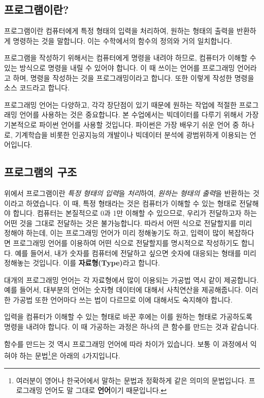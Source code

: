 \documentclass[twoside]{article}
\begin{document}
\subsection{프로그램이란?} 

프로그램이란 컴퓨터에게 특정 형태의 입력을 처리하여, 원하는 형태의 출력을 반환하게 명령하는 것을 말합니다. 이는 수학에서의 함수의 정의와 거의 일치합니다. 

프로그램을 작성하기 위해서는 컴퓨터에게 명령을 내려야 하므로, 컴퓨터가 이해할 수 있는 방식으로 명령을 내릴 수 있어야 합니다. 이 때 쓰이는 언어를 프로그래밍 언어라고 하며, 명령을 작성하는 것을 프로그래밍이라고 합니다. 또한 이렇게 작성한 명령을 소스 코드라고 합니다. 

프로그래밍 언어는 다양하고, 각각 장단점이 있기 때문에 원하는 작업에 적절한 프로그래밍 언어를 사용하는 것은 중요합니다. 본 수업에서는 빅데이터를 다루기 위해서 가장 기본적으로 파이썬 언어를 사용할 것입니다. 파이썬은 가장 배우기 쉬운 언어 중 하나로, 기계학습을 비롯한 인공지능의 개발이나 빅데이터 분석에 광범위하게 이용되는 언어입니다. 

\subsection{프로그램의 구조} 

위에서 프로그램이란 \textit{특정 형태의 입력}을 \textit{처리}하여, \textit{원하는 형태의 출력}을 반환하는 것이라고 하였습니다. 이 때, 특정 형태라는 것은 컴퓨터가 이해할 수 있는 형태로 전달해야 합니다. 컴퓨터는 본질적으로 0과 1만 이해할 수 있으므로, 우리가 전달하고자 하는 어떤 것을 그대로 전달하는 것은 불가능합니다. 따라서 어떤 식으로 전달할지를 미리 정해야 하는데, 이는 프로그래밍 언어가 미리 정해놓기도 하고, 입력이 많이 복잡하다면 프로그래밍 언어를 이용하여 어떤 식으로 전달할지를 명시적으로 작성하기도 합니다. 예를 들어서, 내가 숫자를 컴퓨터에 전달하고 싶으면 숫자에 대응되는 형태를 미리 정해놓는 것입니다. 이를 \textbf{자료형(Type)}라고 합니다.

대개의 프로그래밍 언어는 각 자료형에서 많이 이용되는 가공법 역시 같이 제공합니다. 예를 들어서, 대부분의 언어는 숫자형 데이터에 대해서 사칙연산을 제공해줍니다. 이러한 가공법 또한 언어마다 쓰는 법이 다르므로 이에 대해서도 숙지해야 합니다. 

입력을 컴퓨터가 이해할 수 있는 형태로 바꾼 후에는 이를 원하는 형태로 가공하도록 명령을 내려야 합니다. 이 때 가공하는 과정은 하나의 큰 함수를 만드는 것과 같습니다. 


함수를 만드는 것 역시 프로그래밍 언어에 따라 차이가 있습니다. 보통 이 과정에서 익혀야 하는 문법\footnote{여러분이 영어나 한국어에서 말하는 문법과 정확하게 같은 의미의 문법입니다. 프로그래밍 언어도 말 그대로 \textbf{언어}이기 때문입니다.}은 아래의 4가지입니다. 
\end{document}
